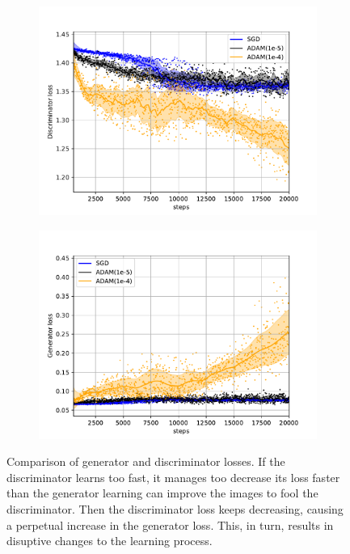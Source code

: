 \documentclass[aps,prl,twocolumn,groupedaddress,amsmath,amssymb]{revtex4-1}
\begin{document}
    \begin{figure}[tbp]
        \begin{center}
        \begin{subfigure}[c]{\linewidth}
        \includegraphics[width=\linewidth]{figures/dloss_opt.pdf}
        \label{Discriminator loss}
        \end{subfigure}
        \begin{subfigure}[c]{\linewidth}
        \includegraphics[width=\linewidth]{figures/gloss_opt.pdf}
        \label{Generator loss (logarithmic scale)}
        \end{subfigure}
        \end{center}
        \caption{Comparison of generator and discriminator losses. If the discriminator learns 
        too fast, it manages too decrease its loss faster than the generator learning can improve
        the images to fool the discriminator. Then the discriminator loss keeps decreasing, causing
        a perpetual increase in the generator loss. This, in turn, results in disuptive changes
        to the learning process.}
        \label{fig:gdloss}
    \end{figure}
\end{document}
